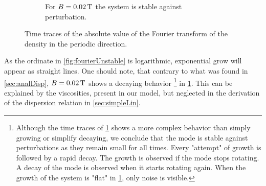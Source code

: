 \begin{figure}[htbp]
\begin{subfigure}[h]{0.45\textwidth}
        \caption{For $B=0.02\, \text{T}$ the system is stable against perturbation.}
        \label{fig:fourierStable}
    \end{subfigure}%
    \caption{Time traces of the absolute value of the Fourier transform of the density in the periodic direction.}
    \label{fig:absFTn}
\end{figure}
%
As the ordinate in \cref{fig:fourierUnstable} is logarithmic, exponential grow will appear as straight lines.
One should note, that contrary to what was found in \cref{sec:analDisp}, $B=0.02\, \text{T}$ shows a decaying behavior%
\footnote{Although the time traces of \cref{fig:fourierStable} shows a more complex behavior than simply growing or simplify decaying, we conclude that the mode is stable against perturbations as they remain small for all times.
    Every "attempt" of growth is followed by a rapid decay.
    The growth is observed if the mode stops rotating.
    A decay of the mode is observed when it starts rotating again.
    When the growth of the system is "flat" in \cref{fig:fourierStable}, only noise is visible.
}
in \cref{fig:fourierStable}.
This can be explained by the viscosities, present in our model, but neglected in the derivation of the dispersion relation in \cref{sec:simpleLin}.

